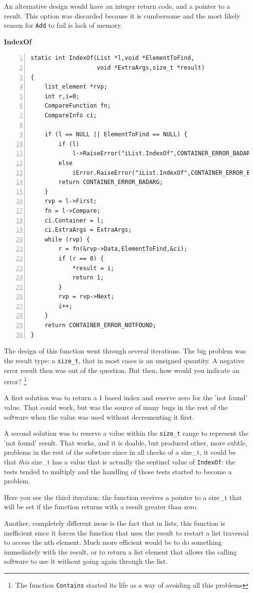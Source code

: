 \documentclass[12pt,a4paper]{memoir} %
\newif\iftth
\newcommand{\container}{}
\newcommand{\function}[1] {%
\vspace{0.2in}
\par\noindent
\textbf{#1}\index{#1!code for \container} \hrulefill
\iftth\else
\nopagebreak
\fi
\noindent\begin{Verbatim}[numbers=left, xleftmargin=7mm]}
\begin{document}
{{An alternative design would have an integer return code, and a pointer to a result. This option was discarded because it is cumbersome and the most likely reason for \texttt{Add} to fail is lack of memory.
\function{IndexOf}
static int IndexOf(List *l,void *ElementToFind,
                   void *ExtraArgs,size_t *result)
{
    list_element *rvp;
    int r,i=0;
    CompareFunction fn;
    CompareInfo ci;

    if (l == NULL || ElementToFind == NULL) {
        if (l)
            l->RaiseError("iList.IndexOf",CONTAINER_ERROR_BADARG);
        else
            iError.RaiseError("iList.IndexOf",CONTAINER_ERROR_BADARG);
        return CONTAINER_ERROR_BADARG;
    }
    rvp = l->First;
    fn = l->Compare;
    ci.Container = l;
    ci.ExtraArgs = ExtraArgs;
    while (rvp) {
        r = fn(&rvp->Data,ElementToFind,&ci);
        if (r == 0) {
            *result = i;
            return 1;
        }
        rvp = rvp->Next;
        i++;
    }
    return CONTAINER_ERROR_NOTFOUND;
}
\end{Verbatim}
The design of this function went through several iterations. The big problem was the result type: a \texttt{size\_t}, that in most cases is an unsigned quantity. A negative error result then was out of the question. But then, how would you indicate an error? \footnote{The function \texttt{Contains} started its life as a way of avoiding all this problems}

A first solution was to return a 1 based index and reserve zero for the 'not found' value. That could work, but was the source of many bugs in the rest of the software when the value was used without decrementing it first. 

A second solution was to reserve a value within the \texttt{size\_t} range to represent the 'not found' result. That works, and it is doable, but produced other, more subtle, problems in the rest of the sofwtare since in all checks of a size\_t, it could be that \textsl{this} size\_t has a value that is actually the sentinel value of \texttt{IndexOf}: the tests tended to multiply and the handling of those tests started to become a problem.

Here you see the third iteration: the function receives a pointer to a size\_t that will be set if the function returns with a result greater than zero.

Another, completely different issue is the fact that in lists, this function is inefficient since it forces the function that uses the result to restart a list traversal to access the nth element. Much more efficient would be to do something immediately with the result, or to return a list element that allows the calling software to use it without going again through the list. 

}}
\end{document}
